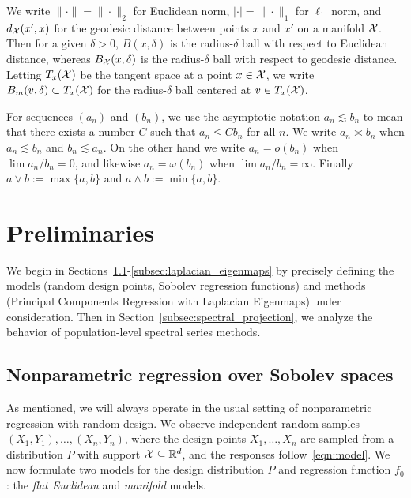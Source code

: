 We write $\|\cdot\| = \|\cdot\|_2$ for Euclidean norm, $|\cdot| = \|\cdot\|_1$ for $\ell_1$ norm, and $d_{\mathcal{X}}(x',x)$ for the geodesic distance between points $x$ and $x'$ on a manifold $\mathcal{X}$. Then for a given $\delta > 0$, $B(x,\delta)$ is the radius-$\delta$ ball with respect to Euclidean distance, whereas $B_{\mathcal{X}}(x,\delta)$ is the radius-$\delta$ ball with respect to geodesic distance. Letting $T_x(\mathcal{X})$ be the tangent space at a point $x \in \mathcal{X}$, we write $B_m(v,\delta) \subset T_x(\mathcal{X})$ for the radius-$\delta$ ball centered at $v \in T_x(\mathcal{X})$.

For sequences $(a_n)$ and $(b_n)$, we use the asymptotic notation $a_n \lesssim b_n$ to mean that there exists a number $C$ such that $a_n \leq C b_n$ for all $n$. We write $a_n \asymp b_n$ when $a_n \lesssim b_n$ and $b_n \lesssim a_n$. On the other hand we write $a_n = o(b_n)$ when $\lim a_n/b_n = 0$, and likewise $a_n = \omega(b_n)$ when $\lim a_n/b_n = \infty$. Finally $a \vee b := \max\{a,b\}$ and $a \wedge b := \min\{a,b\}$.

\section{Preliminaries}
\label{sec:setup_main_results}

We begin in Sections~\ref{subsec:regression_laplacian_eigenmaps}-\ref{subsec:laplacian_eigenmaps} by precisely defining the models (random design points, Sobolev regression functions) and methods (Principal Components Regression with Laplacian Eigenmaps) under consideration. Then in Section~\ref{subsec:spectral_projection}, we analyze the behavior of population-level spectral series methods.

\subsection{Nonparametric regression over Sobolev spaces}
\label{subsec:regression_laplacian_eigenmaps}

As mentioned, we will always operate in the usual setting of nonparametric regression with random design. We observe independent random samples $(X_1,Y_1),\ldots,(X_n,Y_n)$, where the design points $X_1,\ldots,X_n$ are sampled from a distribution $P$ with support $\mathcal{X} \subseteq \mathbb{R}^d$, and the responses follow~\eqref{eqn:model}. We now formulate two models for the design distribution $P$ and regression function $f_0$: the \emph{flat Euclidean} and \emph{manifold} models.

